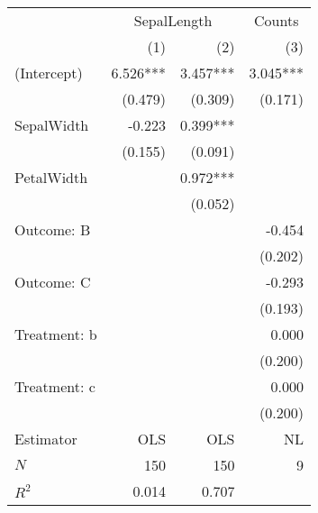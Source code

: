 \begin{tabular}{lrrr}
\toprule
             & \multicolumn{2}{c}{SepalLength} & \multicolumn{1}{c}{Counts} \\ 
\cmidrule(lr){2-3} \cmidrule(lr){4-4} 
             &      (1) &                  (2) &                        (3) \\ 
\midrule
(Intercept)  & 6.526*** &             3.457*** &                   3.045*** \\ 
             &  (0.479) &              (0.309) &                    (0.171) \\ 
SepalWidth   &   -0.223 &             0.399*** &                            \\ 
             &  (0.155) &              (0.091) &                            \\ 
PetalWidth   &          &             0.972*** &                            \\ 
             &          &              (0.052) &                            \\ 
Outcome: B   &          &                      &                     -0.454 \\ 
             &          &                      &                    (0.202) \\ 
Outcome: C   &          &                      &                     -0.293 \\ 
             &          &                      &                    (0.193) \\ 
Treatment: b &          &                      &                      0.000 \\ 
             &          &                      &                    (0.200) \\ 
Treatment: c &          &                      &                      0.000 \\ 
             &          &                      &                    (0.200) \\ 
\midrule
Estimator    &      OLS &                  OLS &                         NL \\ 
\midrule
$N$          &      150 &                  150 &                          9 \\ 
$R^2$        &    0.014 &                0.707 &                            \\ 
\bottomrule
\end{tabular}
